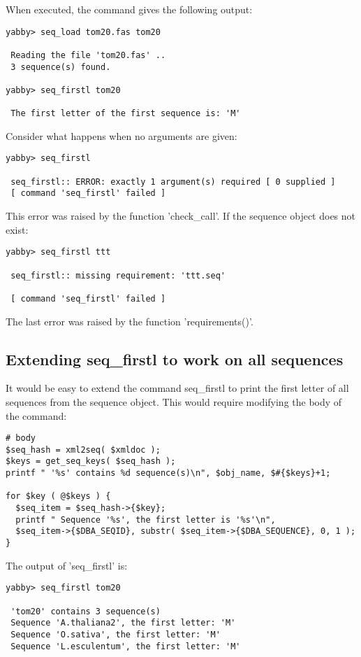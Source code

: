 When executed, the command gives the following output:

\begin{verbatim}
yabby> seq_load tom20.fas tom20

 Reading the file 'tom20.fas' ..
 3 sequence(s) found.

yabby> seq_firstl tom20

 The first letter of the first sequence is: 'M'
\end{verbatim}

Consider what happens when no arguments are given:

\begin{verbatim}
yabby> seq_firstl 

 seq_firstl:: ERROR: exactly 1 argument(s) required [ 0 supplied ]
 [ command 'seq_firstl' failed ]
\end{verbatim}

This error was raised by the function 'check\_call'. If the sequence
object does not exist:

\begin{verbatim}
yabby> seq_firstl ttt

 seq_firstl:: missing requirement: 'ttt.seq'

 [ command 'seq_firstl' failed ]
\end{verbatim}

The last error was raised by the function 'requirements()'.

\subsection{Extending seq\_firstl to work on all sequences}

It would be easy to extend the command seq\_firstl to print the
first letter of all sequences from the sequence object. This would
require modifying the body of the command:

\begin{verbatim}
# body
$seq_hash = xml2seq( $xmldoc );
$keys = get_seq_keys( $seq_hash );
printf " '%s' contains %d sequence(s)\n", $obj_name, $#{$keys}+1;

for $key ( @$keys ) {
  $seq_item = $seq_hash->{$key};
  printf " Sequence '%s', the first letter is '%s'\n",
  $seq_item->{$DBA_SEQID}, substr( $seq_item->{$DBA_SEQUENCE}, 0, 1 );
}
\end{verbatim}

The output of 'seq\_firstl' is:

\begin{verbatim}
yabby> seq_firstl tom20

 'tom20' contains 3 sequence(s)
 Sequence 'A.thaliana2', the first letter: 'M'
 Sequence 'O.sativa', the first letter: 'M'
 Sequence 'L.esculentum', the first letter: 'M'
\end{verbatim}

